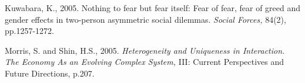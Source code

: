 \documentclass[12pt, letterpaper]{article}
\theoremstyle{plain}
\begin{document}
\begin{thebibliography}{10}
\bibitem{} Kuwabara, K., 2005. Nothing to fear but fear itself: Fear of fear, fear of greed and gender effects in two-person asymmetric social dilemmas. \textit{Social Forces,} 84(2), pp.1257-1272.








\bibitem{} Morris, S. and Shin, H.S., 2005. \textit{Heterogeneity and Uniqueness in Interaction. The Economy As an Evolving Complex System,} III: Current Perspectives and Future Directions, p.207.







\end{thebibliography}
\end{document}
